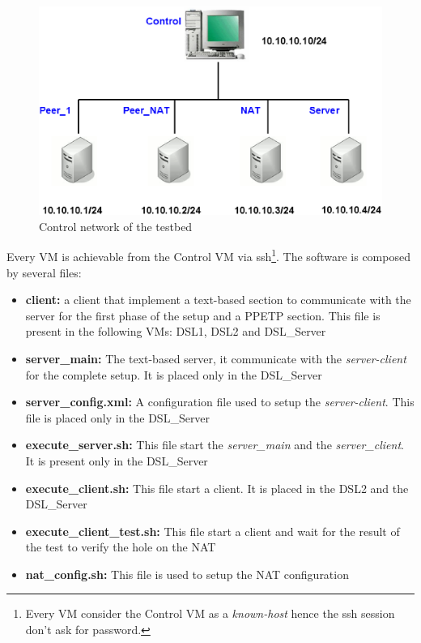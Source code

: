 \begin{figure}[htbp]
	\centering
		\includegraphics[scale=0.4]{control_network.eps}
	\caption[Testbed Control Network]{Control network of the testbed}
	\label{fig:control_network}
\end{figure}
Every VM is achievable from the Control VM via ssh\footnote{Every VM consider the Control VM as a \emph{known-host} hence the ssh session don't ask for password.}. 
The software is composed by several files:
\begin{itemize}
	\item \textbf{client:} a client that implement a text-based section to communicate with the server for the first phase of the setup and a PPETP section. This file is present in the following VMs: DSL1, DSL2 and DSL\_Server
	\item \textbf{server\_main:} The text-based server, it communicate with the \emph{server-client} for the complete setup. It is placed only in the DSL\_Server
	\item \textbf{server\_config.xml:} A configuration file used to setup the \emph{server-client}. This file is placed only in the DSL\_Server
	\item \textbf{execute\_server.sh:} This file start the \emph{server\_main} and the \emph{server\_client}. It is present only in the DSL\_Server
	\item \textbf{execute\_client.sh:} This file start a client. It is placed in the DSL2 and the DSL\_Server
	\item \textbf{execute\_client\_test.sh:} This file start a client and wait for the result of the test to verify the hole on the NAT
	\item \textbf{nat\_config.sh:} This file is used to setup the NAT configuration
\end{itemize}  
